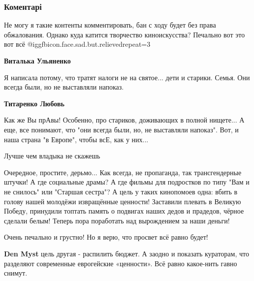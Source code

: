  
 
 
 
 
\subsubsection{Коментарі}
\label{sec:09_11_2021.fb.titarenko_lubov.1.semja_lbgt_film.cmt}

\begin{itemize} %
Не могу я такие контенты комментировать, бан с ходу будет без права обжалования.
Однако куда катится творчество киноискусства?
Печально вот это вот всё  @igg{fbicon.face.sad.but.relieved}{repeat=3} 

\begin{itemize} %
\textbf{Виталька Ульяненко} 

Я написала потому, что тратят налоги не на святое... дети и старики. Семья. Они
всегда были, но не выставляли напоказ.

\textbf{Титаренко Любовь} 

Как же Вы прАвы! Особенно, про стариков, доживающих в полной нищете... А еще,
все понимают, что "они всегда были, но, не выставляли напоказ". Вот, и наша
страна "в Европе", чтобы всЕ, как у них...

\end{itemize} %


Лучше чем владыка не скажешь


Очередное, простите, дерьмо... Как всегда, не пропаганда, так трансгендерные
штучки! А где социальные драмы? А где фильмы для подростков по типу "Вам и не
снилось" или "Старшая сестра"? А цель у таких кинопомоев одна: вбить в голову
нашей молодёжи извращённые ценности! Заставили плевать в Великую
Победу, принудили топтать память о подвигах наших дедов и прадедов, чёрное
сделали белым! Теперь пора поработать над вырождением за наши деньги!

Очень печально и грустно! Но я верю, что просвет всё равно будет!

\begin{itemize} %
\textbf{Den Myst} цель другая - распилить бюджет.
А заодно и показать кураторам, что разделяют современные еврогейские «ценности».
Всё равно какое-нить гавно снимут.
\end{itemize} %


\end{itemize}
